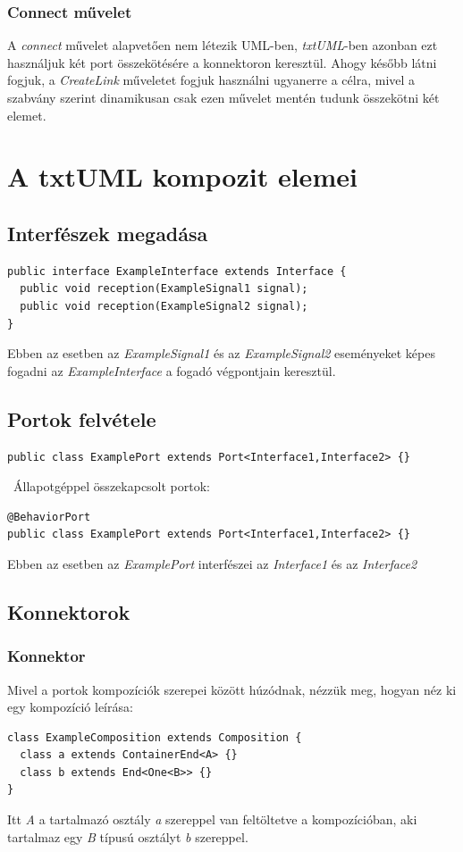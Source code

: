 \documentclass[a4paper,12pt]{report}
\begin{document}
\subsubsection{Connect művelet}
A \textit{connect} művelet alapvetően nem létezik UML-ben, \textit{txtUML}-ben azonban ezt használjuk két port összekötésére a konnektoron keresztül. Ahogy később látni fogjuk, a \textit{CreateLink} műveletet fogjuk használni ugyanerre a célra, mivel a szabvány szerint dinamikusan csak ezen művelet mentén tudunk összekötni két elemet.

\section{A txtUML kompozit elemei}
\subsection{Interfészek megadása}
\begin{lstlisting}
public interface ExampleInterface extends Interface {
  public void reception(ExampleSignal1 signal);
  public void reception(ExampleSignal2 signal);
}
\end{lstlisting}
Ebben az esetben az \textit{ExampleSignal1} és az \textit{ExampleSignal2} eseményeket képes fogadni az \textit{ExampleInterface} a fogadó végpontjain keresztül.
 
\subsection{Portok felvétele}
\begin{lstlisting}
public class ExamplePort extends Port<Interface1,Interface2> {}
\end{lstlisting}
\
Állapotgéppel összekapcsolt portok:
\begin{lstlisting}
@BehaviorPort
public class ExamplePort extends Port<Interface1,Interface2> {}
\end{lstlisting}
Ebben az esetben az \textit{ExamplePort} interfészei az \textit{Interface1} és az \textit{Interface2}


\subsection{Konnektorok}
\subsubsection{Konnektor} 
Mivel a portok kompozíciók szerepei között húzódnak, nézzük meg, hogyan néz ki egy kompozíció leírása:
\begin{lstlisting}
class ExampleComposition extends Composition {
  class a extends ContainerEnd<A> {}
  class b extends End<One<B>> {}
}
\end{lstlisting}
Itt \textit{A} a tartalmazó osztály \textit{a} szereppel van feltöltetve a kompozícióban, aki tartalmaz egy \textit{B} típusú osztályt \textit{b} szereppel.
\end{document}
